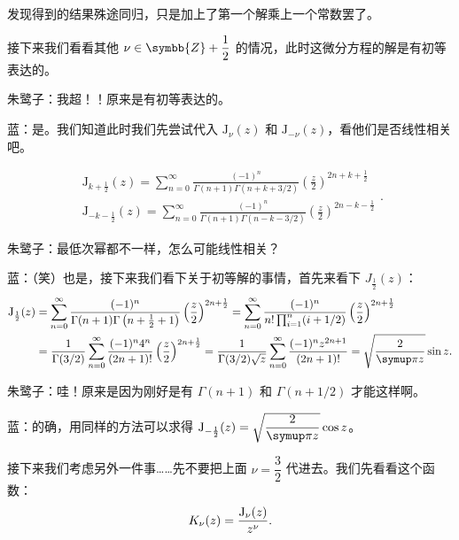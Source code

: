 发现得到的结果殊途同归，只是加上了第一个解乘上一个常数罢了。

接下来我们看看其他 \(\nu \in \symbb{Z} +\dfrac{1}{2}\) 的情况，此时这微分方程的解是有初等表达的。

朱鹭子：我超！！原来是有初等表达的。

蓝：是。我们知道此时我们先尝试代入 \(\mathrm J_ \nu (z)\) 和 \( \mathrm J_ {-\nu }(z)\)，看他们是否线性相关吧。

\[
	\begin{aligned}
		\mathrm J_ {k+\frac{1}{2}} (z) = \sum_{n=0}^{\infty} \frac{(-1)^n}{\Gamma (n+1)\Gamma (n+k +3 /2)} \left( \frac{z}{2} \right) ^{2n+k +\frac{1}{2} } \\
		\mathrm J_ {-k-\frac{1}{2}} (z) = \sum_{n=0}^{\infty} \frac{(-1)^n}{\Gamma (n+1)\Gamma (n-k -3 /2)} \left( \frac{z}{2} \right) ^{2n-k -\frac{1}{2} }
	\end{aligned}
	.\]

朱鹭子：最低次幂都不一样，怎么可能线性相关？

蓝：（笑）也是，接下来我们看下关于初等解的事情，首先来看下 \( J_{\frac{1}{2}}(z)\)：
\[
	\begin{aligned}
		\besselj_{\frac{1}{2}}(z) & = \sum_{n=0}^{\infty} \frac{(-1)^n}{\Gamma (n+1)\Gamma \left( n+\frac{1}{2} +1 \right) } \left( \frac{z}{2} \right) ^{2n+\frac{1}{2}}=
		\sum_{n=0}^{\infty} \frac{(-1)^n }{n!\prod_{i=1}^{n} (i+ 1/ 2) } \left( \frac{z}{2} \right) ^{2n+\frac{1}{2}}                                                                                                                                                              \\
		                          & =\frac{1}{\Gamma (3 /2)}\sum_{n=0}^{\infty} \frac{(-1)^n 4^n}{(2n+1)!}\left( \frac{z}{2} \right) ^{2n+\frac{1}{2}} = \frac{1}{\Gamma (3 /2)\sqrt{z}}\sum_{n=0}^{\infty} \frac{(-1)^n z ^{2n+1}}{(2n+1)!} = \sqrt{\frac{2}{\symup \pi z}}\sin z
		.\end{aligned}
\]

朱鹭子：哇！原来是因为刚好是有 \(\Gamma (n+1)\) 和 \(\Gamma (n+1 /2)\) 才能这样啊。

蓝：的确，用同样的方法可以求得 \(\besselj _{-\frac{1}{2}}(z)=\sqrt{\dfrac{2}{\symup \pi z}}\cos  z\)。

接下来我们考虑另外一件事……先不要把上面 \(\nu =\dfrac{3}{2}\) 代进去。我们先看看这个函数：
\[
	K_{\nu }(z) =  \frac{\operatorname{J} _{\nu }(z)}{z^\nu }
	.\]


